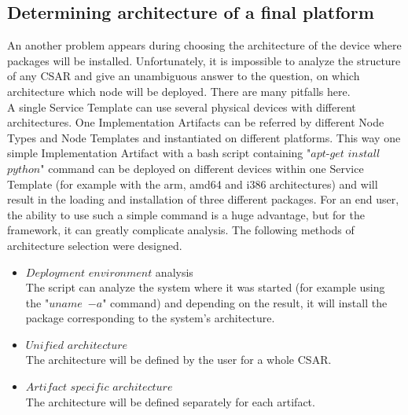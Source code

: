 \subsection{Determining architecture of a final platform}
An another problem appears during choosing the architecture of the device where packages will be installed.
Unfortunately, it is impossible to analyze the structure of any CSAR and give an unambiguous answer to the question, on which architecture which node will be deployed.
There are many pitfalls here.\\
A single Service Template can use several physical devices with different architectures.
One Implementation Artifacts can be referred by different Node Types and Node Templates and instantiated on different platforms.
This way one simple Implementation Artifact with a bash script containing "$apt$-$get$ $install$ $python$" command can be deployed on different devices within one Service Template (for example with the arm, amd64 and i386 architectures) and will result in the loading and installation of three different packages. 
For an end user, the ability to use such a simple command is a huge advantage, but for the framework, it can greatly complicate analysis.
The following methods of architecture selection were designed.
\begin{itemize}
	\item $Deployment$ $environment$ analysis\\
	The script can analyze the system where it was started (for example using the "$uname$~$-a$" command) and depending on the result, it will install the package corresponding to the system's architecture.
	\item $Unified$ $architecture$\\
	The architecture will be defined by the user for a whole CSAR.
	\item $Artifact$ $specific$ $architecture$\\
	The architecture will be defined separately for each artifact.
\end{itemize}
